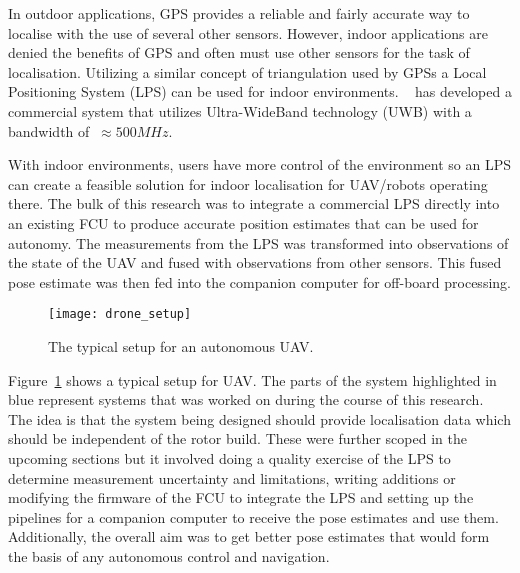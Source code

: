 In outdoor applications, GPS provides a reliable and fairly accurate way to localise with the use of several other sensors.
    However, indoor applications are denied the benefits of GPS and often must use other sensors for the task of localisation.
    Utilizing a similar concept of triangulation used by GPSs a Local Positioning System (LPS) can be used for indoor environments.
    ~\citep{pozyx2018pozyx} has developed a commercial system that utilizes Ultra-WideBand technology (UWB) with a bandwidth of $~\approx 500MHz$.

With indoor environments, users have more control of the environment so an LPS can create a feasible solution for indoor localisation for UAV/robots operating there.
    The bulk of this research was to integrate a commercial LPS directly into an existing FCU to produce accurate position estimates that can be used for autonomy.
    The measurements from the LPS was transformed into observations of the state of the UAV and fused with observations from other sensors.
    This fused pose estimate was then fed into the companion computer for off-board processing.
    \begin{figure}[h!]
        \centering
        \texttt{[image: drone\_setup]}
        \caption{The typical setup for an autonomous UAV.}
        \label{fig:ds}
    \end{figure}

    Figure~\ref{fig:ds} shows a typical setup for UAV.
    The parts of the system highlighted in blue represent systems that was worked on during the course of this research.
    The idea is that the system being designed should provide localisation data which should be independent of the rotor build.
    These were further scoped in the upcoming sections but it involved doing a quality exercise of the LPS to determine measurement uncertainty and limitations,
    writing additions or modifying the firmware of the FCU to integrate the LPS and setting up the pipelines for a companion computer to receive the pose estimates and use them.
    Additionally, the overall aim was to get better pose estimates that would form the basis of any autonomous control and navigation.


